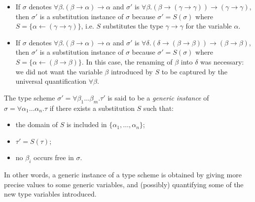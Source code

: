 \Example
\begin{itemize}
\item 
If $\sigma$ denotes $\forall \beta . (\beta \rightarrow \alpha) \rightarrow \alpha$
and
$\sigma'$ is $\forall \beta . (\beta \rightarrow (\gamma \rightarrow \gamma))
                                 \rightarrow (\gamma \rightarrow \gamma)$,
then $\sigma'$
is a substitution instance of $\sigma$ because $\sigma' = S(\sigma)$
where $S=\{\alpha \leftarrow (\gamma \rightarrow \gamma)\}$, i.e. $S$
substitutes the type $\gamma \rightarrow \gamma$ for the variable $\alpha$.
\item 
If $\sigma$ denotes $\forall \beta . (\beta \rightarrow \alpha) \rightarrow \alpha$
and
$\sigma'$ is $\forall \delta . (\delta \rightarrow (\beta \rightarrow \beta))
                                 \rightarrow (\beta \rightarrow \beta)$,
then $\sigma'$ is a substitution instance of $\sigma$ because $\sigma' = S(\sigma)$
where $S=\{\alpha \leftarrow (\beta \rightarrow \beta)\}$. In this case,
the renaming of $\beta$ into $\delta$ was necessary: we did not want the
variable $\beta$ introduced by $S$ to be captured by the universal
quantification $\forall \beta$.
\end{itemize}
\End
%
The type scheme $\sigma' = \forall \beta_1 \ldots \beta_m . \tau'$ is
said to be a {\em generic instance} of
$\sigma = \forall \alpha_1 \ldots \alpha_n . \tau$ if there exists a
substitution $S$ such that:
\begin{itemize}
\item the domain of $S$ is included in $\{\alpha_1, \ldots, \alpha_n\}$;
\item $\tau' = S(\tau)$;
\item no $\beta_i$ occurs free in $\sigma$.
\end{itemize}
In other words, a generic instance of a type scheme is obtained by giving more
precise values to some generic variables, and (possibly) quantifying some of
the new type variables introduced.

